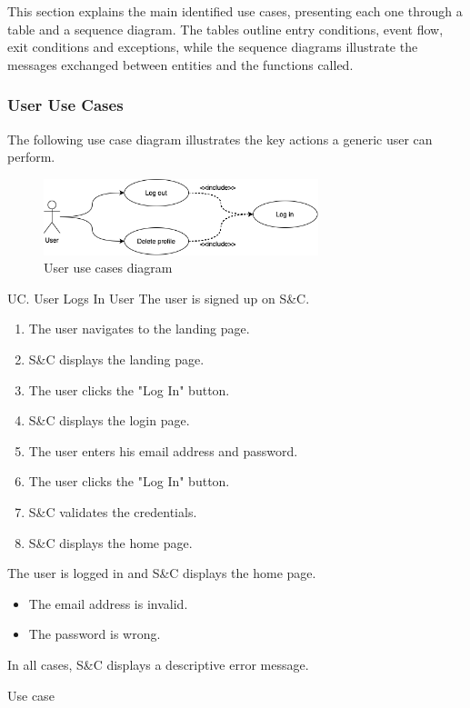 This section explains the main identified use cases, presenting each one through a table and a sequence diagram.
The tables outline entry conditions, event flow, exit conditions and exceptions, while the sequence diagrams illustrate the messages exchanged between entities and the functions called.

\setcounter{uc}{1}

\subsubsection{User Use Cases}
The following use case diagram illustrates the key actions a generic user can perform.

\begin{figure}[h]
    \centering
    \includegraphics[width=8cm]{images/use-case-diagrams/user.png}
    \caption{User use cases diagram}
\end{figure}

\clearpage
\begin{usecase}
    {UC\theuc. User Logs In}
    {User}
    {The user is signed up on S\&C.}
    {\begin{enumerate}[leftmargin=*]
        \item The user navigates to the landing page.
        \item S\&C displays the landing page.
        \item The user clicks the "Log In" button.
        \item S\&C displays the login page.
        \item The user enters his email address and password.
        \item The user clicks the "Log In" button.
        \item S\&C validates the credentials.
        \item S\&C displays the home page.
    \end{enumerate}}
    {The user is logged in and S\&C displays the home page.}
    {\begin{itemize}[leftmargin=*, label=\tiny\textbullet]
        \item The email address is invalid.
        \item The password is wrong.
        \end{itemize}
        In all cases, S\&C displays a descriptive error message.}
    {Use case \theuc}
\end{usecase}

